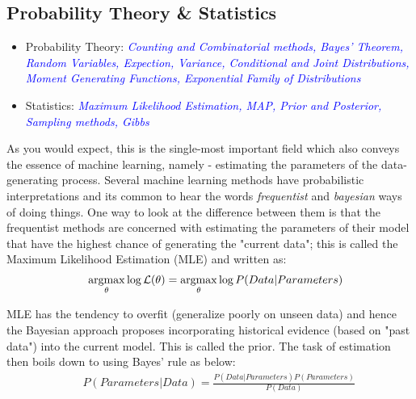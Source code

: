 \documentclass[a4paper]{article}
\begin{document}
\subsection{Probability Theory \& Statistics}
\begin{itemize}
\item Probability Theory: \textcolor{blue}{\textit{Counting and Combinatorial methods, Bayes' Theorem, Random Variables, Expection, Variance, Conditional and Joint Distributions, Moment Generating Functions, Exponential Family of Distributions}}
\item Statistics: \textcolor{blue}{\textit{Maximum Likelihood Estimation, MAP, Prior and Posterior, Sampling methods, Gibbs}}
\end{itemize}
As you would expect, this is the single-most important field which also conveys the essence of machine learning, namely - estimating the parameters of the data-generating process. Several machine learning methods have probabilistic interpretations and its common to hear the words {\it frequentist} and {\it bayesian} ways of doing things. One way to look at the difference between them is that the frequentist methods are concerned with estimating the parameters of their model that have the highest chance of generating the "current data"; this is called the Maximum Likelihood Estimation (MLE) and written as: \\

\begin{equation} \label{eq:1}
\begin{aligned}
&& \underset{\theta}{\operatorname{argmax}} \log {\cal L } (\theta) = \underset{\theta}{\operatorname{argmax}} \log P(Data|Parameters)
\end{aligned}
\end{equation}


\noindent  MLE has the tendency to overfit (generalize poorly on unseen data) and hence the Bayesian approach proposes incorporating historical evidence (based on "past data") into the current model. This is called the prior. The task of estimation then boils down to using Bayes' rule as below: \\

\begin{equation} \label{eq:2}
\begin{aligned}
& & P (Parameters|Data) = \frac{ P(Data|Parameters) P(Parameters)}{P(Data)}
\end{aligned}
\end{equation}
\end{document}
